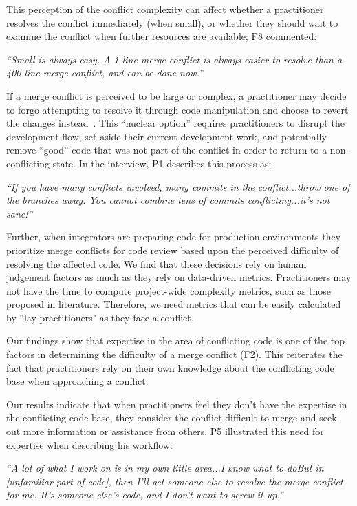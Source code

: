 This perception of the conflict complexity can affect whether a practitioner resolves the conflict immediately (when small), or whether they should wait to examine the conflict when further resources are available; P8 commented:
\begin{quoting}
\textit{``Small is always easy. A 1-line merge conflict is always easier to resolve than a 400-line merge conflict, and can be done now.''}
\end{quoting}

If a merge conflict is perceived to be large or complex, a practitioner may decide to forgo attempting to resolve it through code manipulation and choose to revert the changes instead~\cite{Guzzi2015}.
This ``nuclear option'' requires practitioners to disrupt the development flow, set aside their current development work, and potentially remove ``good'' code that was not part of the conflict in order to return to a non-conflicting state.
In the interview, P1 describes this process as:
\begin{quoting}
\textit{``If you have many conflicts involved, many commits in the conflict...throw one of the branches away. You cannot combine tens of commits conflicting...it's not sane!''}
\end{quoting}

Further, when integrators are preparing code for production environments they prioritize merge conflicts for code review based upon the perceived difficulty of resolving the affected code.
We find that these decisions rely on human judgement factors as much as they rely on data-driven metrics.
Practitioners may not have the time to compute project-wide complexity metrics, such as those proposed in  literature. Therefore, we need metrics that can be easily calculated by ``lay practitioners" as they face a conflict. 

\label{knowledge-based-factors}
Our findings show that expertise in the area of conflicting code is one of the top factors in determining the difficulty of a merge conflict (F2). This reiterates the fact that practitioners rely on their own knowledge about the conflicting code base when approaching a conflict. 

Our results indicate that when practitioners feel they don't have the expertise in the conflicting code base, they consider the conflict difficult to merge and seek out more information or assistance from others. 
P5 illustrated this need for expertise when describing his workflow: 
\begin{quoting}
	\textit{``A lot of what I work on is in my own little area...I know what to do\textellipsis But in [unfamiliar part of code], then I'll get someone else to resolve the merge conflict for me. It's someone else's code, and I don't want to screw it up.''}
\end{quoting}



